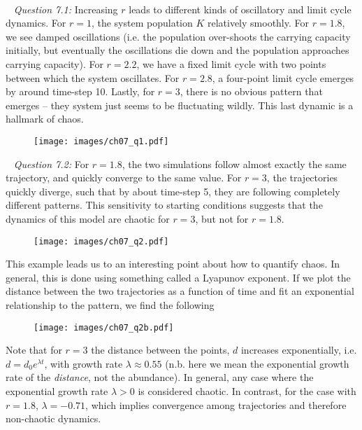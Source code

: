 \documentclass[12pt]{article}
\begin{document}
~\newline

\pagebreak
{}

~\newline
\textit{Question 7.1:}
\newline
Increasing $r$ leads to different kinds of oscillatory and limit cycle dynamics. For $r=1$, the system population $K$ relatively smoothly. For $r=1.8$, we see damped oscillations (i.e. the population over-shoots the carrying capacity initially, but eventually the oscillations die down and the population approaches carrying capacity). For $r=2.2$, we have a fixed limit cycle with two points between which the system oscillates. For $r=2.8$, a four-point limit cycle emerges by around time-step 10. Lastly, for $r=3$, there is no obvious pattern that emerges -- they system just seems to be fluctuating wildly. This last dynamic is a hallmark of chaos.

\begin{figure}[ht]
  \texttt{[image: images/ch07\_q1.pdf]}
\end{figure}

~\newline
\textit{Question 7.2:}
\newline
For $r=1.8$, the two simulations follow almost exactly the same trajectory, and quickly converge to the same value. For $r=3$, the trajectories quickly diverge, such that by about time-step 5, they are following completely different patterns. This sensitivity to starting conditions suggests that the dynamics of this model are chaotic for $r=3$, but not for $r=1.8$.

\begin{figure}[ht]
  \texttt{[image: images/ch07\_q2.pdf]}
\end{figure}

This example leads us to an interesting point about how to quantify chaos. In general, this is done using something called a Lyapunov exponent. If we plot the distance between the two trajectories as a function of time and fit an exponential relationship to the pattern, we find the following

\begin{figure}[ht]
  \texttt{[image: images/ch07\_q2b.pdf]}
\end{figure}
Note that for $r=3$ the distance between the points, $d$ increases exponentially, i.e. $d = d_0 e^{\lambda t}$, with growth rate $\lambda \approx 0.55$ (n.b. here we mean the exponential growth rate of the \textit{distance}, not the abundance). In general, any case where the exponential growth rate $\lambda > 0$ is considered chaotic. In contrast, for the case with $r=1.8$, $\lambda = -0.71$, which implies convergence among trajectories and therefore non-chaotic dynamics.
\end{document}
